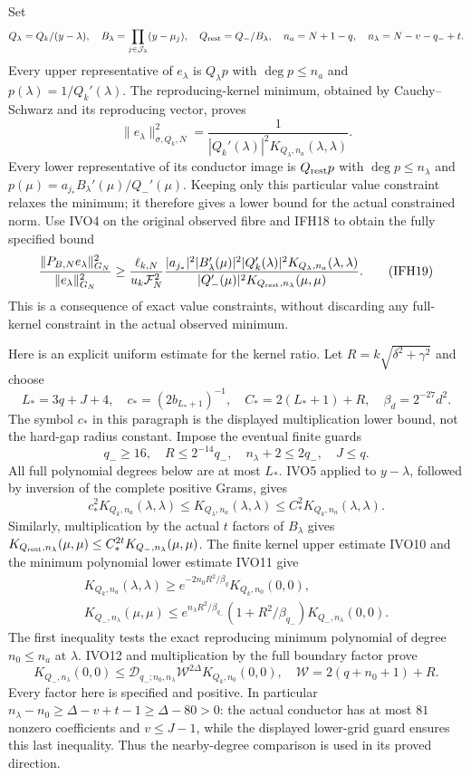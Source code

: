 \documentclass[11pt]{article}
\begin{document}
Set
\[
Q_\lambda=Q_k/(y-\lambda),\quad
B_\lambda=\prod_{j\in\mathcal J_\lambda}(y-\mu_j),\quad
Q_{\rm rest}=Q_-/B_\lambda,\quad
n_a=N+1-q,\quad n_\lambda=N-v-q_-+t.
\]
Every upper representative of $e_\lambda$ is $Q_\lambda p$ with
$\deg p\le n_a$ and $p(\lambda)=1/Q_k'(\lambda)$.
The reproducing-kernel minimum, obtained by Cauchy--Schwarz and
its reproducing vector, proves
\[
\|e_\lambda\|_{\sigma,Q_k,N}^2
=\frac1{|Q_k'(\lambda)|^2K_{Q_\lambda,n_a}(\lambda,\lambda)}.
\tag{IFH18}
\]
Every lower representative of its conductor image is $Q_{\rm rest}p$
with $\deg p\le n_\lambda$ and
$p(\mu)=a_{j_*}B_\lambda'(\mu)/Q_-'(\mu)$.
Keeping only this particular value constraint relaxes the minimum;
it therefore gives a lower bound for the actual constrained norm.
Use IVO4 on the original observed fibre and IFH18 to obtain the
fully specified bound
\[
\frac{\|P_{B,N}e_\lambda\|_{G_N}^2}{\|e_\lambda\|_{G_N}^2}
\ge\frac{\ell_{k,N}}{u_k\mathcal F_N^2}
\frac{|a_{j_*}|^2|B_\lambda'(\mu)|^2|Q_k'(\lambda)|^2
 K_{Q_\lambda,n_a}(\lambda,\lambda)}
 {|Q_-'(\mu)|^2K_{Q_{\rm rest},n_\lambda}(\mu,\mu)} .
\tag{IFH19}
\]
This is a consequence of exact value constraints, without discarding
any full-kernel constraint in the actual observed minimum.

Here is an explicit uniform estimate for the kernel ratio.
Let $R=k\sqrt{\delta^2+\gamma^2}$ and choose
\[
L_*=3q+J+4,\quad
c_*=(2b_{L_*+1})^{-1},\quad C_*=2(L_*+1)+R,
\quad\beta_d=2^{-27}d^2 .
\]
The symbol $c_*$ in this paragraph is the displayed multiplication
lower bound, not the hard-gap radius constant.
Impose the eventual finite guards
\[
q_-\ge16,\quad R\le2^{-14}q_-,\quad
n_\lambda+2\le2q_-,\quad J\le q .
\]
All full polynomial degrees below are at most $L_*$.
IVO5 applied to $y-\lambda$, followed by inversion of the complete
positive Grams, gives
\[
c_*^2K_{Q_k,n_a}(\lambda,\lambda)
\le K_{Q_\lambda,n_a}(\lambda,\lambda)
\le C_*^2K_{Q_k,n_a}(\lambda,\lambda).
\]
Similarly, multiplication by the actual $t$ factors of $B_\lambda$
gives
$K_{Q_{\rm rest},n_\lambda}(\mu,\mu)
\le C_*^{2t}K_{Q_-,n_\lambda}(\mu,\mu)$.
The finite kernel upper estimate IVO10 and the minimum polynomial
lower estimate IVO11 give
\[
\begin{gathered}
K_{Q_k,n_a}(\lambda,\lambda)
\ge e^{-2n_0R^2/\beta_q}K_{Q_k,n_0}(0,0),\\
K_{Q_-,n_\lambda}(\mu,\mu)
\le e^{n_\lambda R^2/\beta_{q_-}}
(1+R^2/\beta_{q_-})K_{Q_-,n_\lambda}(0,0).
\end{gathered}
\]
The first inequality tests the exact reproducing minimum polynomial
of degree $n_0\le n_a$ at $\lambda$.
IVO12 and multiplication by the full boundary factor prove
\[
K_{Q_-,n_\lambda}(0,0)
\le\mathcal D_{q_-;n_0,n_\lambda}
 \mathcal W^{2\Delta}K_{Q_k,n_0}(0,0),
\quad \mathcal W=2(q+n_0+1)+R.
\]
Every factor here is specified and positive. In particular
$n_\lambda-n_0\ge\Delta-v+t-1\ge\Delta-80>0$:
the actual conductor has at most $81$ nonzero coefficients and
$v\le J-1$, while the displayed lower-grid guard ensures this
last inequality. Thus the nearby-degree comparison is used in
its proved direction.
\end{document}
